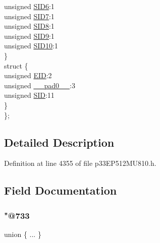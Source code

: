 \begin{DoxyCompactItemize}
\begin{tabbing}
\>\>unsigned \hyperlink{structtag_c1_r_x_f11_s_i_d_b_i_t_s_a70d70952133eb2389d5c326f9f0e8035}{SID6}:1\\
\>\>unsigned \hyperlink{structtag_c1_r_x_f11_s_i_d_b_i_t_s_a34097fb76decd431701fa2d86a22328e}{SID7}:1\\
\>\>unsigned \hyperlink{structtag_c1_r_x_f11_s_i_d_b_i_t_s_afe74894633244fdb0b0c01b4e8c522e7}{SID8}:1\\
\>\>unsigned \hyperlink{structtag_c1_r_x_f11_s_i_d_b_i_t_s_a33587704948067005c2a6a3ccc503c99}{SID9}:1\\
\>\>unsigned \hyperlink{structtag_c1_r_x_f11_s_i_d_b_i_t_s_a1a9084031c7f5fb16007feeebf0d8216}{SID10}:1\\
\>\} \\
\>struct \{\\
\>\>unsigned \hyperlink{structtag_c1_r_x_f11_s_i_d_b_i_t_s_ae80b378c9141f7c03e0b4e55b5f4b54d}{EID}:2\\
\>\>unsigned \hyperlink{structtag_c1_r_x_f11_s_i_d_b_i_t_s_adf71f3d8410c1f1dbbc96680a92c49af}{\_\_pad0\_\_}:3\\
\>\>unsigned \hyperlink{structtag_c1_r_x_f11_s_i_d_b_i_t_s_af88edf93b2fee2432665bd84f51287e4}{SID}:11\\
\>\} \\
\}; \\

\end{tabbing}\end{DoxyCompactItemize}


\subsection{Detailed Description}


Definition at line 4355 of file p33\+E\+P512\+M\+U810.\+h.



\subsection{Field Documentation}
\mbox{\label{structtag_c1_r_x_f11_s_i_d_b_i_t_s_ae720591d1813db75d49ef1d5b0d61e14}} 
\subsubsection{\texorpdfstring{"@733}{@733}}
{\footnotesize\ttfamily union \{ ... \} }

\mbox{\label{structtag_c1_r_x_f11_s_i_d_b_i_t_s_adf71f3d8410c1f1dbbc96680a92c49af}} 
